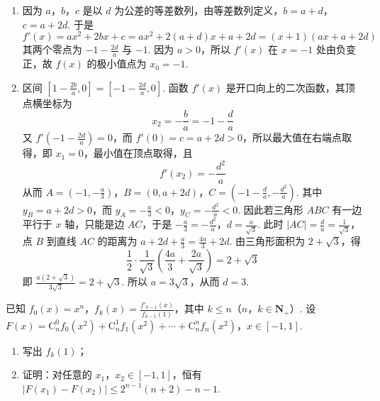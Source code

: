 \begin{solution}
\begin{enumerate}
\item 因为 \(a\)，\(b\)，\(c\) 是以 \(d\) 为公差的等差数列，由等差数列定义，\(b=a+d\)，\(c=a+2d\).
于是
\[
f'(x)=ax^2+2bx+c=ax^2+2(a+d)x+a+2d=(x+1)\left(ax+a+2d\right)
\]
其两个零点为 \(-1-\frac{2d}{a}\) 与 \(-1\). 因为 \(a>0\)，所以 \(f'(x)\) 在 \(x=-1\) 处由负变正，故 \(f(x)\) 的极小值点为 \(x_0=-1\).

\item 区间 \(\left[1-\frac{2b}{a},0\right]=\left[-1-\frac{2d}{a},0\right]\). 函数 \(f'(x)\) 是开口向上的二次函数，其顶点横坐标为
\[
x_2=-\frac{b}{a}=-1-\frac{d}{a}
\]
又 \(f'\left(-1-\frac{2d}{a}\right)=0\)，而 \(f'(0)=c=a+2d>0\)，所以最大值在右端点取得，即 \(x_1=0\)，最小值在顶点取得，且
\[
f'(x_2)=-\frac{d^2}{a}
\]
从而
\(A=\left(-1,-\frac{a}{3}\right)\)，\(B=(0,a+2d)\)，\(C=\left(-1-\frac{d}{a},-\frac{d^2}{a}\right)\).
其中 \(y_B=a+2d>0\)，而 \(y_A=-\frac{a}{3}<0\)，\(y_C=-\frac{d^2}{a}<0\). 因此若三角形 \(ABC\) 有一边平行于 \(x\) 轴，只能是边 \(AC\)，于是
\(-\frac{a}{3}=-\frac{d^2}{a}\)，\(d=\frac{a}{\sqrt{3}}\).
此时 \(|AC|=\frac{d}{a}=\frac{1}{\sqrt{3}}\)，点 \(B\) 到直线 \(AC\) 的距离为
\(a+2d+\frac{a}{3}=\frac{4a}{3}+2d\).
由三角形面积为 \(2+\sqrt{3}\)，得
\[
\frac{1}{2}\cdot\frac{1}{\sqrt{3}}\left(\frac{4a}{3}+\frac{2a}{\sqrt{3}}\right)=2+\sqrt{3}
\]
即 \(\frac{a(2+\sqrt{3})}{3\sqrt{3}}=2+\sqrt{3}\). 所以 \(a=3\sqrt{3}\)，从而 \(d=3\).
\end{enumerate}
\end{solution}

\begin{problem}
已知 \(f_{0}(x) = x^{n}\)，\(f_{k}(x) = \frac{f'_{k-1}(x)}{f_{k-1}(1)}\)，其中 \(k \leqslant n\)（\(n\)，\(k\in\mathbf{N}_{+}\)）. 设 \(F(x) = \mathrm C_n^0 f_0(x^{2}) + \mathrm C_n^1 f_1(x^{2}) + \cdots + \mathrm C_n^n f_n(x^{2})\)，\(x \in [-1,1]\).

\begin{enumerate}
\item 写出 \(f_k(1)\)；
\item 证明：对任意的 \(x_{1}\)，\(x_{2}\in[-1,1]\)，恒有 \(|F(x_{1}) - F(x_{2})| \leqslant 2^{n-1}(n+2) - n - 1\).
\end{enumerate}
\end{problem}

